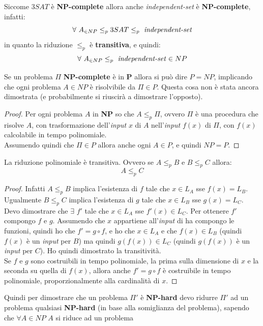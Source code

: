 Siccome $3SAT$ è \textbf{NP-complete} allora anche \textit{independent-set} è
\textbf{NP-complete}, infatti:
\[\forall\,\, A_{\in NP}\leq_p 3SAT\leq_p \mbox{ \textit{independent-set}}\]
in quanto la riduzione $\leq_p$ è \textbf{transitiva}, e quindi:
\[\forall\,\, A_{\in NP}\leq_p \mbox{ \textit{independent-set}}\in NP\]
\begin{teorema}
  Se un problema $\Pi$ \textbf{NP-complete} è in \textbf{P} allora si può dire
  $P=NP$, implicando che ogni problema $A\in NP$ è risolvibile da $\Pi\in P$.
  Questa cosa non è stata ancora dimostrata (e probabilmente si riuscirà
  a dimostrare l'opposto).
\end{teorema}
\begin{proof}
  Per ogni problema $A$ in \textbf{NP} so che $A\leq_p \Pi$, ovvero $\Pi$ è una
  procedura che risolve $A$, con trasformazione dell'\textit{input} $x$ di $A$ nell'\textit{input}
  $f(x)$ di $\Pi$, con $f(x)$ calcolabile in tempo polinomiale.\\
  Assumendo quindi che $\Pi\in P$ allora anche ogni $A\in P$, e quindi $NP=P$.
\end{proof}
\begin{teorema}
  La riduzione polinomiale è transitiva. Ovvero se $A\leq_p B$ e $B\leq_p C$
  allora:
  \[A\leq_p C\]
\end{teorema}
\begin{proof}
  Infatti $A\leq_p B$ implica l'esistenza di $f$ tale che $x\in L_A$ sse
  $f(x)=L_B$. Ugualmente $B\leq_p C$ implica l'esistenza di $g$ tale che $x\in
  L_B$ sse $g(x)=L_C$.\\
  Devo dimostrare che $\exists\,\,f'$ tale che $x\in L_A$ sse $f'(x)\in
  L_C$. Per ottenere $f'$ compongo $f$ e $g$. Assumendo che $x$ appartiene
  all'\textit{input} di ha compongo le funzioni, quindi ho che $f'=g\circ f$,
  e ho che $x\in L_A$ e che $f(x)\in L_B$ (quindi $f(x)$ è un \textit{input} per $B$) ma
  quindi $g(f(x))\in L_C$ (quindi $g(f(x))$ è un \textit{input} per $C$). Ho quindi
  dimostrato la transitività.\\
  Se $f$ e $g$ sono costruibili in tempo polinomiale, la prima sulla dimensione
  di $x$ e la seconda su quella di $f(x)$, allora anche $f'=g\circ f$
  è costruibile in tempo polinomiale, proporzionalmente alla cardinalità di $x$.
\end{proof}
Quindi per dimostrare che un problema $\Pi'$ è \textbf{NP-hard} devo ridurre
$\Pi'$ ad un problema qualsiasi \textbf{NP-hard} (in base alla somiglianza del
problema), sapendo che $\forall A\in NP$ $A$ si riduce ad un problema

